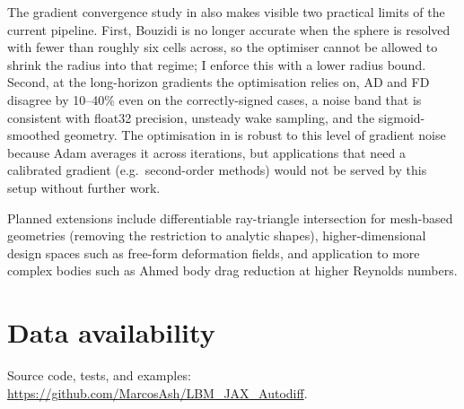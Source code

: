 \documentclass[10pt,twocolumn]{article}
\begin{document}
The gradient convergence study in  also
makes visible two practical limits of the current pipeline. First,
Bouzidi is no longer accurate when the sphere is resolved with fewer
than roughly six cells across, so the optimiser cannot be allowed to
shrink the radius into that regime; I enforce this with a lower
radius bound. Second, at the long-horizon gradients the optimisation
relies on, AD and FD disagree by 10--40\% even on the correctly-signed
cases, a noise band that is consistent with float32 precision,
unsteady wake sampling, and the sigmoid-smoothed geometry. The
optimisation in  is robust to this level of
gradient noise because Adam averages it across iterations, but
applications that need a calibrated gradient (e.g.\ second-order
methods) would not be served by this setup without further work.

Planned extensions include differentiable ray-triangle intersection
for mesh-based geometries (removing the restriction to analytic
shapes), higher-dimensional design spaces such as free-form
deformation fields, and application to more complex bodies such as
Ahmed body drag reduction at higher Reynolds numbers.


\section*{Data availability}

Source code, tests, and examples:
\url{https://github.com/MarcosAsh/LBM_JAX_Autodiff}.
\end{document}
